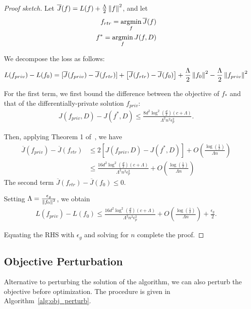 \documentclass{article} %
\begin{document}
\begin{proof}[Proof sketch]
Let $\overline{J}(f) = L(f) + \frac{\Lambda}{2} \left\lVert f\right\rVert^2$, and let \begin{align*}
f_{rtr} = \operatorname*{argmin}_f \overline{J}(f)\\
f^* = \operatorname*{argmin}_f J(f, D)
\end{align*}

We decompose the loss as follows:
\begin{align*}
L(f_{priv}) -  L(f_0) = [\overline{J}(f_{priv}) - \overline{J}(f_{rtr})] + \left[\overline{J}(f_{rtr}) - \overline{J}(f_0)\right] + \frac{\Lambda}{2} \left\lVert f_0\right\rVert^2 - \frac{\Lambda}{2} \left\lVert f_{priv}\right\rVert^2
\end{align*}

For the first term, we first bound the difference between the objective of $f_*$ and that of the differentially-private solution $f_{priv}$:
\begin{align}
J(f_{priv}, D) - J(f^*, D) \le \frac{8d^2\log^2{(\frac{d}{\delta})} (c + \Lambda)}{\Lambda^2 n^2 \epsilon_p^2}.\label{thm15:emp}
\end{align}

Then, applying Theorem 1 of~\cite{sridharan2008objective}, we have
\begin{align*}
\overline{J}(f_{priv}) - \overline{J}(f_{rtr}) & \le 2 [J(f_{priv}, D) - J(f^*, D)] + O(\frac{\log{(\frac{1}{\delta})}}{\Lambda n})\\
& \le  \frac{16d^2\log^2{(\frac{d}{\delta})} (c + \Lambda)}{\Lambda^2 n^2 \epsilon_p^2} + O(\frac{\log{(\frac{1}{\delta})}}{\Lambda n})
\end{align*}
The second term $\overline{J}(f_{rtr}) - \overline{J}(f_0) \le 0$.

Setting $\Lambda = \frac{\epsilon_g}{\left\lVert f_0\right\rVert^2}$, we obtain
\begin{align*}
L(f_{priv}) - L(f_0) \le  \frac{16d^2\log^2{(\frac{d}{\delta})} (c + \Lambda)}{\Lambda^2 n^2 \epsilon_p^2} + O(\frac{\log{(\frac{1}{\delta})}}{\Lambda n}) + \frac{\epsilon_g}{2}.
\end{align*}

Equating the RHS with $\epsilon_g$ and solving for $n$ complete the proof.
\end{proof}

\subsection{Objective Perturbation}
Alternative to perturbing the solution of the algorithm, we can also perturb the objective before optimization. The procedure is given in Algorithm~\ref{alg:obj_perturb}.
\end{document}
